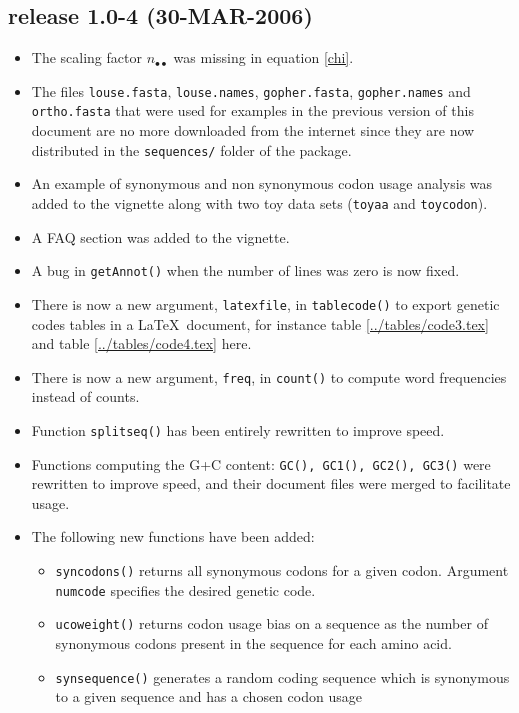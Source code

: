\documentclass{article}
\begin{document}
\subsection*{release 1.0-4 (30-MAR-2006)}

\begin{itemize}
\item The scaling factor $n_{\bullet\bullet}$ was missing in equation \ref{chi}.
\item The files \texttt{louse.fasta}, \texttt{louse.names}, \texttt{gopher.fasta}, \texttt{gopher.names}
and \texttt{ortho.fasta} that were used for examples in the previous version of this document are
no more downloaded from the internet since they are now distributed in the \texttt{sequences/} folder
of the package.
\item An example of synonymous and non synonymous codon usage analysis was added to the
vignette along with two toy data sets (\texttt{toyaa} and \texttt{toycodon}).
\item A FAQ section was added to the vignette.
\item A bug in \texttt{getAnnot()} when the number of lines was zero is now fixed.
\item There is now a new argument, \texttt{latexfile}, in \texttt{tablecode()} to export genetic codes
tables in a \LaTeX~document, for instance table \ref{../tables/code3.tex} and table \ref{../tables/code4.tex} here.
\item There is now a new argument, \texttt{freq}, in \texttt{count()}
  to compute word frequencies instead of counts.
\item Function \texttt{splitseq()} has been entirely rewritten to improve speed.
\item Functions computing the G+C content: \texttt{GC(), GC1(), GC2(),
  GC3()} were rewritten to improve speed, and their document files
  were merged to facilitate usage.
\item The following new functions have been added:
\begin{itemize}
\item \texttt{syncodons()} returns all synonymous codons for a given
  codon. Argument \texttt{numcode} specifies the desired genetic code.
\item \texttt{ucoweight()} returns codon usage bias on a sequence as
  the number of synonymous codons present in the sequence for each
  amino acid.
\item \texttt{synsequence()} generates a random coding sequence which
      is synonymous to a given sequence and has a chosen codon usage

\end{itemize}
\end{itemize}
\end{document}

